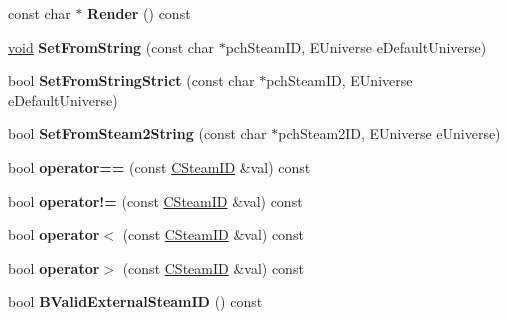 \begin{DoxyCompactItemize}
\item 
\hypertarget{classCSteamID_ada4babea9fee66fba7b8fd1f4c11486d}{}const char $\ast$ {\bfseries Render} () const \label{classCSteamID_ada4babea9fee66fba7b8fd1f4c11486d}

\item 
\hypertarget{classCSteamID_a27556e1b84489fd80cb5dafa2048a6bb}{}\hyperlink{SDL__audio_8h_a52835ae37c4bb905b903cbaf5d04b05f}{void} {\bfseries Set\+From\+String} (const char $\ast$pch\+Steam\+I\+D, E\+Universe e\+Default\+Universe)\label{classCSteamID_a27556e1b84489fd80cb5dafa2048a6bb}

\item 
\hypertarget{classCSteamID_a4149d7cf64072a585c9ef201bbf88f0f}{}bool {\bfseries Set\+From\+String\+Strict} (const char $\ast$pch\+Steam\+I\+D, E\+Universe e\+Default\+Universe)\label{classCSteamID_a4149d7cf64072a585c9ef201bbf88f0f}

\item 
\hypertarget{classCSteamID_af28dc382ff4cafc37c1b277f8e421dd3}{}bool {\bfseries Set\+From\+Steam2\+String} (const char $\ast$pch\+Steam2\+I\+D, E\+Universe e\+Universe)\label{classCSteamID_af28dc382ff4cafc37c1b277f8e421dd3}

\item 
\hypertarget{classCSteamID_a24295b9793258bb5bca578ecb88f5a9b}{}bool {\bfseries operator==} (const \hyperlink{classCSteamID}{C\+Steam\+I\+D} \&val) const \label{classCSteamID_a24295b9793258bb5bca578ecb88f5a9b}

\item 
\hypertarget{classCSteamID_acae54b4c46377677c9363370f9139204}{}bool {\bfseries operator!=} (const \hyperlink{classCSteamID}{C\+Steam\+I\+D} \&val) const \label{classCSteamID_acae54b4c46377677c9363370f9139204}

\item 
\hypertarget{classCSteamID_af2d966d7e370593452910b44cba71e0a}{}bool {\bfseries operator$<$} (const \hyperlink{classCSteamID}{C\+Steam\+I\+D} \&val) const \label{classCSteamID_af2d966d7e370593452910b44cba71e0a}

\item 
\hypertarget{classCSteamID_afa4fe7fa002530b289da1be113bc58a6}{}bool {\bfseries operator$>$} (const \hyperlink{classCSteamID}{C\+Steam\+I\+D} \&val) const \label{classCSteamID_afa4fe7fa002530b289da1be113bc58a6}

\item 
\hypertarget{classCSteamID_aa1d5d5e9757b120a80e813790f113b56}{}bool {\bfseries B\+Valid\+External\+Steam\+I\+D} () const \label{classCSteamID_aa1d5d5e9757b120a80e813790f113b56}

\end{DoxyCompactItemize}
